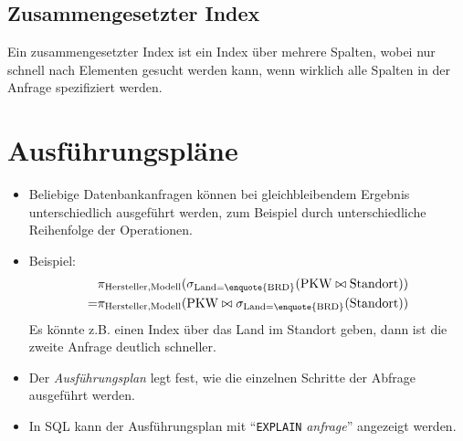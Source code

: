 \documentclass[a4paper, 11pt, accentcolor = tud3b]{tudreport}
\begin{document}
            \subsection{Zusammengesetzter Index} %
                Ein zusammengesetzter Index ist ein Index über mehrere Spalten, wobei nur schnell nach Elementen gesucht werden kann, wenn wirklich alle Spalten in der Anfrage spezifiziert werden.

        \section{Ausführungspläne} %
            \begin{itemize}
            	\item Beliebige Datenbankanfragen können bei gleichbleibendem Ergebnis unterschiedlich ausgeführt werden, zum Beispiel durch unterschiedliche Reihenfolge der Operationen.
            	\item Beispiel:
            		\begin{align*}
	            		  & \pi _ { \text{Hersteller}, \text{Modell} } (\sigma _ { \text{Land} = \text{\enquote{BRD}} } (\text{PKW} \bowtie \text{Standort})) \\
	            		= & \pi _ { \text{Hersteller}, \text{Modell} } (\text{PKW} \bowtie \sigma _ { \text{Land} = \text{\enquote{BRD}} } (\text{Standort}))
            		\end{align*}
            		Es könnte z.B. einen Index über das Land im Standort geben, dann ist die zweite Anfrage deutlich schneller.
            	\item Der \textit{Ausführungsplan} legt fest, wie die einzelnen Schritte der Abfrage ausgeführt werden.
            	\item In SQL kann der Ausführungsplan mit \enquote{\lstinline|EXPLAIN| \textit{anfrage}} angezeigt werden.
            \end{itemize}
\end{document}
